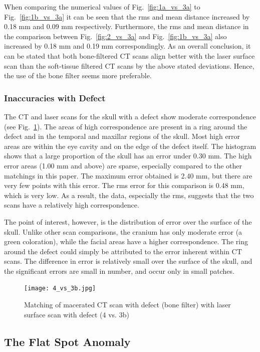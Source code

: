 \documentclass[a4paper]{article}
\begin{document}
When comparing the numerical values of Fig.~\ref{fig:1a_vs_3a} to Fig.~\ref{fig:1b_vs_3a} it can be seen that the rms and mean distance increased by 0.18 mm and 0.09 mm respectively. Furthermore, the rms and mean distance in the comparison between Fig.~\ref{fig:2_vs_3a} and Fig.~\ref{fig:1b_vs_3a} also increased by 0.18 mm and 0.19 mm correspondingly. As an overall conclusion, it can be stated that both bone-filtered CT scans align better with the laser surface scan than the soft-tissue filtered CT scans by the above stated deviations. Hence, the use of the bone filter seems more preferable.
\pagebreak
\pagebreak
\subsubsection{Inaccuracies with Defect} %
The CT and laser scans for the skull with a defect show moderate correspondence (see Fig.~\ref{fig:4_vs_3b}). The areas of high correspondence are present in a ring around the defect and in the temporal and maxillar regions of the skull. Most high error areas are within the eye cavity and on the edge of the defect itself. The histogram shows that a large proportion of the skull has an error under 0.30 mm. The high error areas (1.00 mm and above) are sparse, especially compared to the other matchings in this paper. The maximum error obtained is 2.40 mm, but there are very few points with this error. The rms error for this comparison is 0.48 mm, which is very low. As a result, the data, especially the rms, suggests that the two scans have a relatively high correspondence.

The point of interest, however, is the distribution of error over the surface of the skull. Unlike other scan comparisons, the cranium has only moderate error (a green coloration), while the facial areas have a higher correspondence. The ring around the defect could simply be attributed to the error inherent within CT scans. The difference in error is relatively small over the surface of the skull, and the significant errors are small in number, and occur only in small patches. 

\begin {figure} [ht!]
\centering
\texttt{[image: 4\_vs\_3b.jpg]}
\caption{\label{fig:4_vs_3b}Matching of macerated CT scan with defect (bone filter) with laser surface scan with defect (4 vs. 3b)}
\end{figure}

\subsection{The Flat Spot Anomaly} %
\label{sec:skull_spot}
\end{document}
